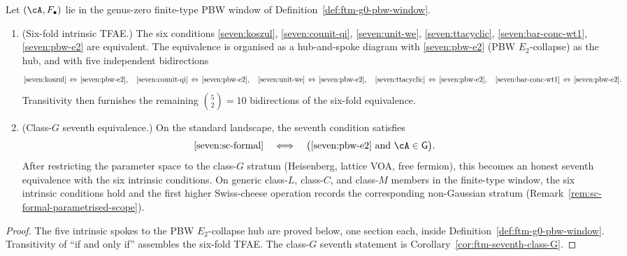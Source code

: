 \begin{theorem}
\label{thm:ftm-seven-fold-tfae-via-hub-spoke}
Let $(\cA,F_\bullet)$ lie in the genus-zero finite-type PBW window of
Definition~\ref{def:ftm-g0-pbw-window}.
\begin{enumerate}[label=\textup{(\Alph*)}]
\item \textup{(Six-fold intrinsic TFAE.)} The six
conditions
\ref{seven:koszul}, \ref{seven:counit-qi}, \ref{seven:unit-we},
\ref{seven:ttacyclic}, \ref{seven:bar-conc-wt1}, \ref{seven:pbw-e2}
are equivalent. The equivalence is organised as a hub-and-spoke
diagram with \ref{seven:pbw-e2} (PBW $E_2$-collapse) as the hub, and
with five independent bidirections
\[
\ref{seven:koszul} \,\Leftrightarrow\, \ref{seven:pbw-e2},
\quad
\ref{seven:counit-qi} \,\Leftrightarrow\, \ref{seven:pbw-e2},
\quad
\ref{seven:unit-we} \,\Leftrightarrow\, \ref{seven:pbw-e2},
\quad
\ref{seven:ttacyclic} \,\Leftrightarrow\, \ref{seven:pbw-e2},
\quad
\ref{seven:bar-conc-wt1} \,\Leftrightarrow\, \ref{seven:pbw-e2}.
\]
Transitivity then furnishes the remaining $\binom{5}{2} = 10$
bidirections of the six-fold equivalence.
\item \textup{(Class-$G$ seventh equivalence.)} On the standard
landscape, the seventh condition satisfies
\[
\ref{seven:sc-formal}
\quad\Longleftrightarrow\quad
\bigl(\ref{seven:pbw-e2}\ \text{and}\ \cA\in\mathsf{G}\bigr).
\]
After restricting the parameter space to the class-$G$ stratum
(Heisenberg, lattice VOA, free fermion), this becomes an honest
seventh equivalence with the six intrinsic conditions.  On generic
class-$L$, class-$C$, and class-$M$ members in the finite-type window,
the six intrinsic conditions hold and the first higher
Swiss-cheese operation records the corresponding non-Gaussian stratum
\textup{(Remark~\ref{rem:sc-formal-parametrised-scope})}.
\end{enumerate}
\end{theorem}

\begin{proof}
The five intrinsic spokes to the PBW $E_2$-collapse hub are proved
below, one section each, inside
Definition~\ref{def:ftm-g0-pbw-window}.  Transitivity of
``if and only if'' assembles the six-fold TFAE.  The class-$G$
seventh statement is Corollary~\ref{cor:ftm-seventh-class-G}.
\end{proof}

